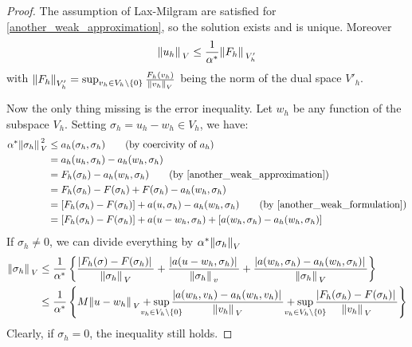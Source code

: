 \begin{proof}
    The assumption of Lax-Milgram are satisfied for \eqref{another_weak_approximation}, so the solution exists and is unique. Moreover
    \[
        \norm*{u_h}_V \leq \frac{1}{\alpha^*} \norm*{F_h}_{V'_h} 
    \]
    with \(\norm{F_h}_{V'_h} = \sup_{v_h \in V_h \backslash \left\{0\right\}} \frac{F_h(v_h)}{\norm{v_h}_V}\) being the norm of the dual space \(V'_h\).

    Now the only thing missing is the error inequality. Let \(w_h\) be any function of the subspace \(V_h\). Setting \(\sigma_h = u_h -w_h \in V_h\), we have:
    \begin{align*}
        \alpha^* \norm*{\sigma_h}^2_V &\leq a_h(\sigma_h, \sigma_h) \tag*{(by coercivity of \(a_h\))} \\
        &= a_h(u_h, \sigma_h) - a_h(w_h, \sigma_h) \\
        &= F_h(\sigma_h) - a_h(w_h, \sigma_h) \tag*{(by \eqref{another_weak_approximation})} \\
        &= F_h(\sigma_h) - F(\sigma_h) + F(\sigma_h) - a_h(w_h, \sigma_h) \\
        &= \left[F_h(\sigma_h)-F(\sigma_h)\right] + a(u, \sigma_h) - a_h(w_h, \sigma_h) \tag*{(by \eqref{another_weak_formulation})} \\
        &= \left[F_h(\sigma_h) - F(\sigma_h)\right] + a(u-w_h, \sigma_h) + \left[a(w_h, \sigma_h) - a_h(w_h, \sigma_h)\right]
    \end{align*}
    If \(\sigma_h \neq 0\), we can divide everything by \(\alpha^*\norm{\sigma_h}_V\)
    \begin{align*}
        \norm*{\sigma_h}_V &\leq \frac{1}{\alpha^*} \left\{\frac{\abs*{F_h(\sigma) - F(\sigma_h)}}{\norm*{\sigma_h}_V} + \frac{\abs*{a(u-w_h,\sigma_h)}}{\norm*{\sigma_h}_v} + \frac{\abs*{a(w_h, \sigma_h) - a_h(w_h, \sigma_h)}}{\norm*{\sigma_h}_V}\right\} \\
        &\leq \frac{1}{\alpha^*} \left\{M\norm*{u-w_h}_V + \sup_{\mathclap{v_h \in V_h \backslash \left\{0\right\}}} \frac{\abs*{a(w_h, v_h) - a_h(w_h, v_h)}}{\norm*{v_h}_V} + \sup_{\mathclap{v_h \in V_h \backslash \left\{0\right\}}}\frac{\abs*{F_h(\sigma_h)-F(\sigma_h)}}{\norm*{v_h}_V}\right\}
    \end{align*}
    Clearly, if \(\sigma_h = 0\), the inequality still holds.


\end{proof}
